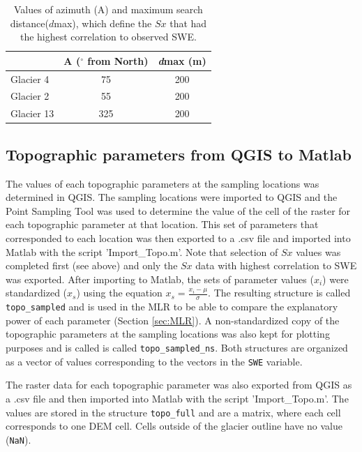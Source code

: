 \documentclass[12pt]{article}
\begin{document}
\begin{enumerate}
\begin{table}[]
\centering
\caption{Values of azimuth (A) and maximum search distance($d$max), which define the $Sx$ that had the highest correlation to observed SWE.}
\label{tab:Sxparams}
\begin{tabular}{lcc}
           & \textbf{A ($^{\circ}$ from North)} & \textbf{\textit{d}max (m)} \\ \hline
Glacier 4  & 75                                & 200                 \\
Glacier 2  & 55                                & 200                 \\
Glacier 13 & 325                            & 200                
\end{tabular}
\end{table}

\end{enumerate}

\subsection{Topographic parameters from QGIS to Matlab}

The values of each topographic parameters at the sampling locations was determined in QGIS. The sampling locations were imported to QGIS and the Point Sampling Tool was used to determine the value of the cell of the raster for each topographic parameter at that location. This set of parameters that corresponded to each location was then exported to a .csv file and imported into Matlab with the script 'Import\_Topo.m'.  Note that selection of $Sx$ values was completed first (see above) and only the $Sx$ data with highest correlation to SWE was exported. After importing to Matlab, the sets of parameter values ($x_i$) were standardized ($x_s$) using the equation $x_s = \frac{x_i-\mu}{\sigma}$. The resulting structure is called \texttt{topo\_sampled} and is used in the MLR to be able to compare the explanatory power of each parameter (Section \ref{sec:MLR}). A non-standardized copy of the topographic parameters at the sampling locations was also kept for plotting purposes and is called is called \texttt{topo\_sampled\_ns}. Both structures are organized as a vector of values corresponding to the vectors in the \texttt{SWE} variable. 

The raster data for each topographic parameter was also exported from QGIS as a .csv file and then imported into Matlab with the script 'Import\_Topo.m'. The values are stored in the structure \texttt{topo\_full} and are a matrix, where each cell corresponds to one DEM cell. Cells outside of the glacier outline have no value (\texttt{NaN}).
\end{document}
